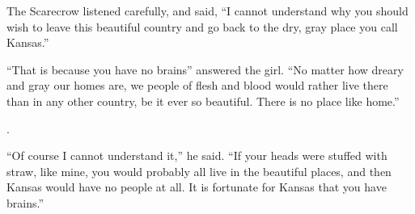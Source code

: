 \documentclass{article}
\begin{document}
The Scarecrow listened carefully, and said, ``I cannot understand why
you should wish to leave this beautiful country and go back to the dry,
gray place you call Kansas.''

``That is because you have no brains'' answered the girl. ``No matter
how dreary and gray our homes are, we people of flesh and blood would
rather live there than in any other country, be it ever so beautiful.
There is no place like home.''

\TheScarecrowsighed.

``Of course I cannot understand it,'' he said. ``If your heads were
stuffed with straw, like mine, you would probably all live in the
beautiful places, and then Kansas would have no people at all. It is
fortunate for Kansas that you have brains.'' 
\end{document}
